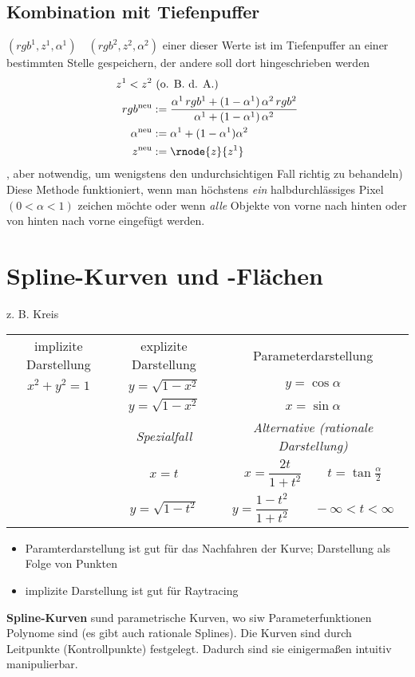 \section{Kombination mit Tiefenpuffer}
$(rgb^1, z^1, \alpha^1)\quad(rgb^2, z^2, \alpha^2)$ einer dieser Werte ist im Tiefenpuffer an einer bestimmten Stelle gespeichern,
	der andere soll dort hingeschrieben werden
\begin{align*}
 z^1 < z^2 &\ \text{(o. B. d. A.)}\\
 rgb^\mathrm{neu} &:= \frac{\alpha^1\,rgb^1 + (1-\alpha^1)\,\alpha^2\,rgb^2}{\alpha^1+(1-\alpha^1)\,\alpha^2}\\
 \alpha^\mathrm{neu} &:= \alpha^1 + (1-\alpha^1) \alpha^2\\
 z^\mathrm{neu} &:= \rnode{z}{z^1} 
\end{align*}
, aber notwendig, um wenigstens den undurchsichtigen Fall richtig zu behandeln)
\\[1em]
Diese Methode funktioniert, wenn man höchstens \emph{ein} halbdurchlässiges Pixel $(0 < \alpha < 1)$ zeichen möchte
oder wenn \emph{alle} Objekte von vorne nach hinten oder von hinten nach vorne eingefügt werden.

\chapter{Spline-Kurven und -Flächen}
\begin{center}
\end{center}
z. B. Kreis
\begin{center}
\begin{tabular}{ccc}
implizite Darstellung & explizite Darstellung & Parameterdarstellung \\
$x^2 + y^2 = 1$		& $y = \sqrt{1 - x^2}$	& $y = \cos \alpha$  \\
			& $y = \sqrt{1 - x^2}$	& $x = \sin \alpha$ \\
		 \hline
			& \emph{Spezialfall}	& \emph{Alternative (rationale Darstellung)} \\
			& $x = t$		& $x = \dfrac{2t}{1+t^2} \qquad t = \tan \frac{\alpha}{2}$\\
			& $y = \sqrt{1 - t^2}$	& $y = \dfrac{1-t^2}{1+t^2} \qquad -\infty < t < \infty$
\end{tabular}
\end{center}
\begin{center}
\end{center}
\begin{itemize}
 \item Paramterdarstellung ist gut für das Nachfahren der Kurve; Darstellung als Folge von Punkten
 \item implizite Darstellung ist gut für Raytracing
\end{itemize}
\Defi	\textbf{Spline-Kurven} sund parametrische Kurven, wo siw Parameterfunktionen Polynome sind (es gibt auch
	rationale Splines). Die Kurven sind durch Leitpunkte (Kontrollpunkte) festgelegt. Dadurch sind sie einigermaßen
	intuitiv manipulierbar.

